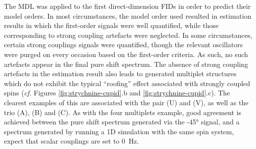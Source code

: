 The \ac{MDL} was applied to the first direct-dimension \acp{FID} in order to
predict their model orders. In most circumstances, the model order used resulted
in estimation results in which the first-order signals were well
quantified, while those corresponding to strong coupling artefacts were neglected.
In some circumstances, certain strong couplings signals were quantified, though
the relevant oscillators were purged on every occasion based on the first-order
criteria. As such, no such artefacts appear in the final pure shift spectrum.
The absence of strong coupling artefacts in the estimation result also leads to
generated multiplet structures which do not exhibit the typical ``roofing''
effect associated with strongly coupled spins (\textit{cf.} Figures
\ref{fig:strychnine-cupid}.b and \ref{fig:strychnine-cupid}.c). The clearest
examples of this are associated with the pair (U) and (V), as well as the trio (A),
(B) and (C). As with the four multiplets example, good agreement is achieved
between the pure shift spectrum generated via the \ang{-45} signal, and a
spectrum generated by running a \ac{1D} simulation with the same spin system,
expect that scalar couplings are set to \qty{0}{\hertz}.

